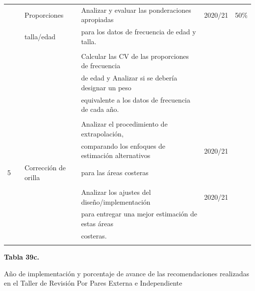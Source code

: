 \documentclass[
  spanish,
]{article}
\begin{document}
\begin{table}[h]
{\begin{tabular}{|c|l|l|l|c|c|}
     &               & Proporciones         & Analizar y evaluar las ponderaciones apropiadas   & 2020/21    & 50\%\\ 
     &               & talla/edad           & para los datos de frecuencia de edad y talla.     &            & \\
     &               &                      &                                                   &            & \\
     &               &                      & Calcular las CV de las proporciones de frecuencia &            & \\ 
     &               &                      & de edad y Analizar si se debería designar un peso &            & \\
     &               &                      & equivalente a los datos de frecuencia de cada año.&            & \\ \hline
     &               &                      &                                                   &            & \\
     &               &                      & Analizar el procedimiento de extrapolación,       &            & \\
     &               &                      & comparando los enfoques de estimación alternativos& 2020/21    & \\
  5  &               &Corrección de orilla  & para las áreas costeras                           &            & \\
     &               &                      &                                                   &            & \\
     &               &                      & Analizar los ajustes del diseño/implementación    & 2020/21    & \\ 
     &               &                      & para entregar una mejor estimación de estas áreas &            & \\
     &               &                      & costeras.                                         &            & \\
     &               &                      &                                                   &            & \\ \hline
  \end{tabular}}
    \end{table}

\pagebreak

\small
\begin{center} 
\textbf{Tabla 39c.}
\end{center}
\begin{center} 
\vspace{-0.2cm} Año de implementación y porcentaje de avance de las recomendaciones realizadas en el Taller de Revisión Por Pares Externa e Independiente
\end{center}
\vspace{-0.2cm}
\end{document}
